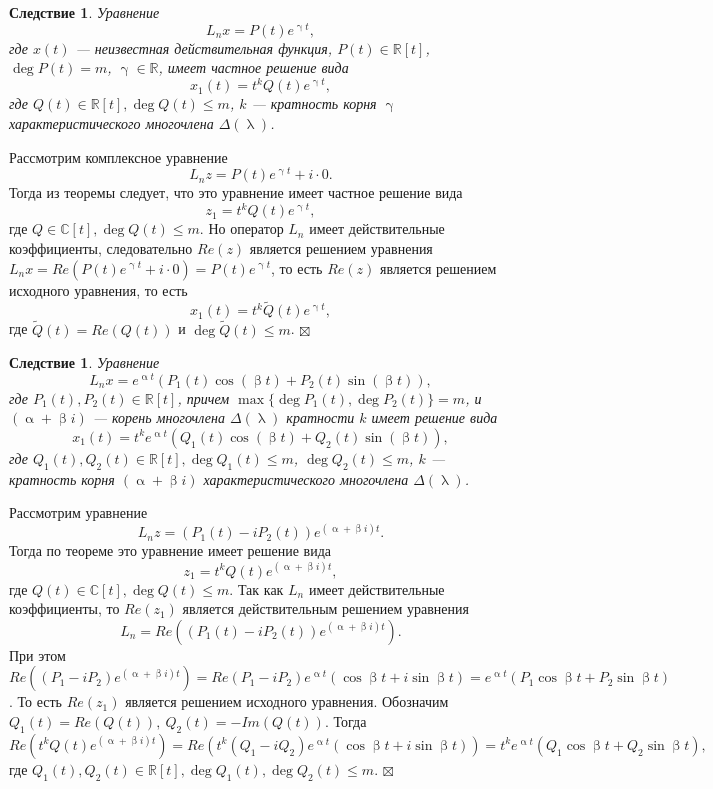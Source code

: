 \documentclass[a4paper, 12pt]{report}
\newenvironment{Proof} %
{\par\noindent{$\blacklozenge$}} %
{\hfill$\scriptstyle\boxtimes$}
\newcommand{\Rm}{\mathbb{R}}
\newcommand{\Cm}{\mathbb{C}}
\renewcommand{\alpha}{\upalpha}
\renewcommand{\beta}{\upbeta}
\renewcommand{\lambda}{\uplambda}
\begin{document}
\newtheorem*{2_5_2}{Следствие}\begin{2_5_2}
	Уравнение $$L_nx = P(t)e^{\upgamma t},$$ где $x(t)$ --- неизвестная действительная функция, $P(t)\in\Rm[t]$, $\deg P(t) = m$, $\upgamma \in \Rm$, имеет частное решение вида $$x_1(t) = t^kQ(t)e^{\upgamma t},$$ где $Q(t) \in \Rm[t], \deg Q(t) \leqslant m$, $k$ --- кратность корня $\upgamma$ характеристического многочлена $\Delta(\lambda)$.
\end{2_5_2}\begin{Proof}
Рассмотрим комплексное уравнение $$L_nz = P(t) e^{\upgamma t} + i\cdot 0.$$ Тогда из теоремы следует, что это уравнение имеет частное решение вида $$z_1 = t^kQ(t)e^{\upgamma t},$$ где $Q\in \Cm[t], \deg Q(t)\leqslant m$. Но оператор $L_n$ имеет действительные коэффициенты, следовательно $Re(z)$ является решением уравнения $L_nx = Re(P(t) e^{\upgamma t} + i\cdot 0) = P(t) e^{\upgamma t}$, то есть $Re(z)$ является решением исходного уравнения, то есть $$x_1(t) = t^k\widetilde{Q}(t)e^{\upgamma t},$$ где $\widetilde{Q}(t) = Re(Q(t))$ и $\deg \widetilde{Q}(t)\leqslant m$.
\end{Proof}
\newtheorem*{2_5_3}{Следствие}\begin{2_5_3}
	Уравнение $$L_nx = e^{\alpha t}(P_1(t)\cos(\beta t) + P_2(t)\sin (\beta t)),$$ где $P_1(t),P_2(t)\in \Rm[t]$, причем $\max\{\deg P_1(t),\deg P_2(t)\} = m$, и $(\alpha + \beta i)$ --- корень многочлена $\Delta (\lambda)$ кратности $k$ имеет решение вида $$x_1(t) = t^ke^{\alpha t}(Q_1(t)\cos(\beta t) + Q_2(t)\sin(\beta t)),$$ где $Q_1(t), Q_2(t) \in \Rm[t], \deg Q_1(t) \leqslant m$, $\deg Q_2(t) \leqslant m$, $k$ --- кратность корня $(\alpha + \beta i)$ характеристического многочлена $\Delta(\lambda)$.
\end{2_5_3}\begin{Proof}
Рассмотрим уравнение $$L_nz = (P_1(t) - i P_2(t))e^{(\alpha + \beta i)t}.$$ Тогда по теореме это уравнение имеет решение вида $$z_1= t^kQ(t)e^{(\alpha + \beta i)t},$$ где $Q(t)\in \Cm[t], \deg Q(t)\leqslant m$. Так как $L_n$ имеет действительные коэффициенты, то $Re(z_1)$ является действительным решением уравнения $$L_n = Re((P_1(t) - i P_2(t))e^{(\alpha + \beta i)t}).$$ При этом $Re((P_1 - i P_2)e^{(\alpha + \beta i)t}) = Re(P_1 - iP_2)e^{\alpha t}(\cos \beta t + i \sin \beta t) = e^{\alpha t}(P_1 \cos \beta t  + P_2 \sin \beta t)$. То есть $Re(z_1)$ является решением исходного уравнения. Обозначим $Q_1(t) = Re(Q(t)),\ Q_2(t) = -Im(Q(t))$. Тогда $$Re(t^kQ(t)e^{(\alpha + \beta i)t}) = Re(t^k(Q_1 - i Q_2)e^{\alpha t}(\cos \beta t + i \sin \beta t)) = t^ke^{\alpha t}(Q_1\cos \beta t + Q_2 \sin \beta t),$$ где $Q_1(t), Q_2(t) \in \Rm[t], \deg Q_1(t), \deg Q_2(t) \leqslant m$. 
\end{Proof}
\end{document}
